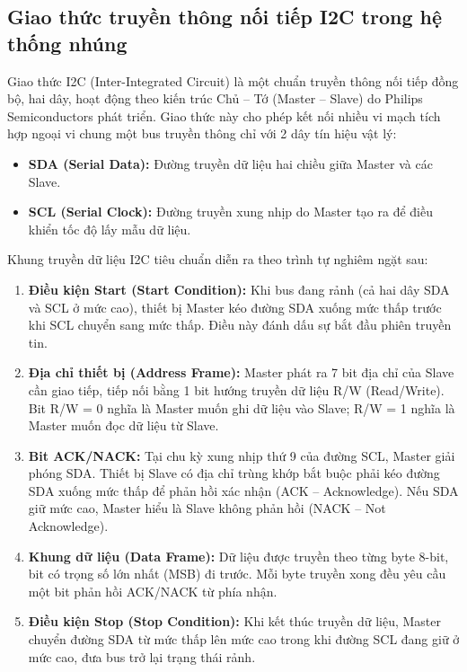 \subsection{Giao thức truyền thông nối tiếp I2C trong hệ thống nhúng}
Giao thức I2C (Inter-Integrated Circuit) là một chuẩn truyền thông nối tiếp đồng bộ, hai dây, hoạt động theo kiến trúc Chủ -- Tớ (Master -- Slave) do Philips Semiconductors phát triển. Giao thức này cho phép kết nối nhiều vi mạch tích hợp ngoại vi chung một bus truyền thông chỉ với 2 dây tín hiệu vật lý:
\begin{itemize}
    \item \textbf{SDA (Serial Data):} Đường truyền dữ liệu hai chiều giữa Master và các Slave.
    \item \textbf{SCL (Serial Clock):} Đường truyền xung nhịp do Master tạo ra để điều khiển tốc độ lấy mẫu dữ liệu.
\end{itemize}

Khung truyền dữ liệu I2C tiêu chuẩn diễn ra theo trình tự nghiêm ngặt sau:
\begin{enumerate}
    \item \textbf{Điều kiện Start (Start Condition):} Khi bus đang rảnh (cả hai dây SDA và SCL ở mức cao), thiết bị Master kéo đường SDA xuống mức thấp trước khi SCL chuyển sang mức thấp. Điều này đánh dấu sự bắt đầu phiên truyền tin.
    \item \textbf{Địa chỉ thiết bị (Address Frame):} Master phát ra 7 bit địa chỉ của Slave cần giao tiếp, tiếp nối bằng 1 bit hướng truyền dữ liệu R/W (Read/Write). Bit R/W = 0 nghĩa là Master muốn ghi dữ liệu vào Slave; R/W = 1 nghĩa là Master muốn đọc dữ liệu từ Slave.
    \item \textbf{Bit ACK/NACK:} Tại chu kỳ xung nhịp thứ 9 của đường SCL, Master giải phóng SDA. Thiết bị Slave có địa chỉ trùng khớp bắt buộc phải kéo đường SDA xuống mức thấp để phản hồi xác nhận (ACK -- Acknowledge). Nếu SDA giữ mức cao, Master hiểu là Slave không phản hồi (NACK -- Not Acknowledge).
    \item \textbf{Khung dữ liệu (Data Frame):} Dữ liệu được truyền theo từng byte 8-bit, bit có trọng số lớn nhất (MSB) đi trước. Mỗi byte truyền xong đều yêu cầu một bit phản hồi ACK/NACK từ phía nhận.
    \item \textbf{Điều kiện Stop (Stop Condition):} Khi kết thúc truyền dữ liệu, Master chuyển đường SDA từ mức thấp lên mức cao trong khi đường SCL đang giữ ở mức cao, đưa bus trở lại trạng thái rảnh.
\end{enumerate}

